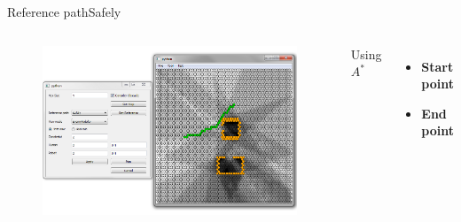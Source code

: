 \begin{frame}{Reference path}{Safely}

\begin{columns}
\begin{figure}
\centering
\includegraphics[width = \textwidth]{./screenshot/safely_reference_path.png}
\end{figure}

\begin{minipage}{\textwidth}
Using $ A^{*} $
\begin{itemize}
\item \textbf{Start point}
\item \textbf{End point}
\end{itemize}
\end{minipage}
\end{columns}

\end{frame}

